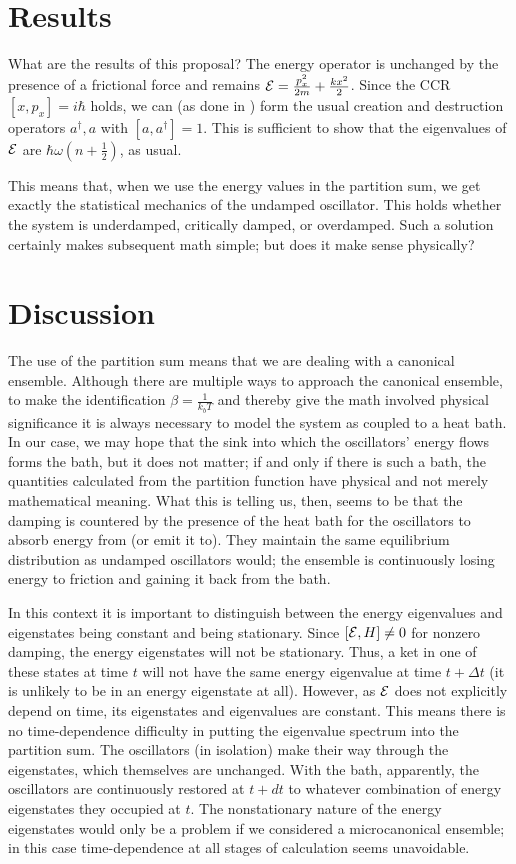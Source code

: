 \section{Results}

What are the results of this proposal?  The energy operator is unchanged by
the presence of a frictional force and remains ${\cal E} = 
\frac{p_{x}^{2}}{2 m} + \frac{k x^2}{2}$.  Since the CCR $[x, p_{x}] = i 
\hbar$ holds, we can (as done in \cite{ft:fest}) form the usual creation and 
destruction operators $a^{\dagger}, a$ with $[a, a^{\dagger}] = 1$.  This is 
sufficient to show that the eigenvalues of ${\cal E}$ are $\hbar \omega (n +
\frac{1}{2})$, as usual.

This means that, when we use the energy values in the partition sum, we get
exactly the statistical mechanics of the undamped oscillator.  This holds
whether the system is underdamped, critically damped, or overdamped.  Such
a solution certainly makes subsequent math simple; but does it make sense
physically?

\section{Discussion}

The use of the partition sum means that we are dealing with a canonical 
ensemble.  Although there are multiple ways to approach the canonical ensemble,
to make the identification $\beta = \frac{1}{k_{b} T}$ and thereby give the
math involved physical significance it is always necessary to model the system
as coupled to a heat bath.  In our case, we may hope that the sink into which
the oscillators' energy flows forms the bath, but it does not matter; if and
only if there is such a bath, the quantities calculated from the partition
function have physical and not merely mathematical meaning.  What this is
telling us, then, seems to be that the damping is countered by the presence
of the heat bath for the oscillators to absorb energy from (or emit it to).
They maintain the same equilibrium distribution as undamped oscillators would;
the ensemble is continuously losing energy to friction and gaining it back
from the bath.

In this context it is important to distinguish between the energy eigenvalues
and eigenstates being constant and being stationary.  Since $[{\cal E}, H] 
\neq 0$ for nonzero damping, the energy eigenstates will not be stationary.
Thus, a ket in one of these states at time $t$ will not have the same
energy eigenvalue at time $t + \Delta t$ (it is unlikely to be in an energy
eigenstate at all).  However, as ${\cal E}$ does not explicitly depend on time,
its eigenstates and eigenvalues are constant.  This means there is no
time-dependence difficulty in putting the eigenvalue spectrum into the
partition sum.  The oscillators (in isolation) make their way through the
eigenstates, which themselves are unchanged.  With the bath, apparently, the
oscillators are continuously restored at $t + dt$ to whatever combination of 
energy eigenstates they occupied at $t$.  The nonstationary nature of the
energy eigenstates would only be a problem if we considered a microcanonical
ensemble; in this case time-dependence at all stages of calculation seems
unavoidable.

